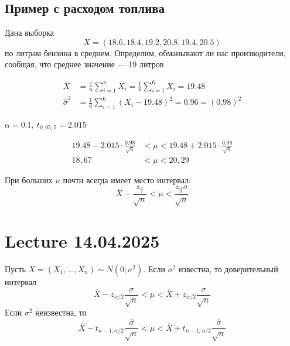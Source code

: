 \documentclass[a4paper, 10pt]{article}
\begin{document}
\subsection{Пример с расходом топлива}
Дана выборка 
\begin{equation*}
    X=(18.6,18.4,19.2,20.8,19.4,20.5)
\end{equation*}
по литрам бензина в среднем. Определим, обманывают ли нас производители, сообщая, что среднее значение — 19 литров

\begin{equation*}
    \begin{aligned}
        \overline{X}&=\frac{1}{n}\sum_{i=1}^nX_i=\frac{1}{6}\sum_{i=1}^6X_i=19.48\\
        \widehat{\sigma}^{2}&=\frac{1}{6} \sum_{i=1}^{6}\left(X_{i}-19.48\right)^{2}=0.96=(0.98)^{2}
    \end{aligned}
\end{equation*}

$\alpha=0.1,\ t_{0,05;5}=2.015$

\begin{equation*}
\begin{aligned}
    19.48-2.015 \cdot \frac{0.98}{\sqrt{6}}&<\mu<19.48+2.015 \cdot \frac{0.98}{\sqrt{6}}\\
    18,67&<\mu<20,29
\end{aligned}
\end{equation*}

\comment При больших $n$ почти всегда имеет место интервал:
\begin{equation*}
    \overline{X}-\frac{z_{\frac{\alpha}{2}}}{\sqrt{n}}<\mu<\frac{z_{\frac{\alpha}{2}} \sigma}{\sqrt{n}}
\end{equation*}


\newpage
\section{Lecture 14.04.2025}
Пусть $X=(X_1,\ldots,X_n)\sim N(0;\sigma^2)$. Если $\sigma^2$ известна, то доверительный интервал 
\begin{equation*}
    \overline{X}-z_{\alpha/2}\frac{\sigma}{\sqrt{n}}<\mu<\overline{X}+z_{\alpha/2}\frac{\sigma}{\sqrt{n}}
\end{equation*}
Если $\sigma^2$ неизвестна, то 
\begin{equation*}
    \overline{X}-t_{n-1;\alpha/2}\frac{\widehat{\sigma}}{\sqrt{n}}<\mu<\overline{X}+t_{n-1;\alpha/2}\frac{\widehat{\sigma}}{\sqrt{n}}
\end{equation*}
\end{document}
